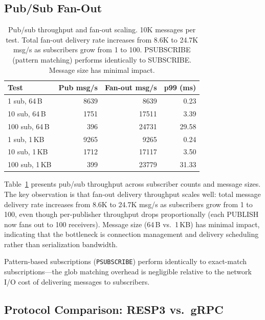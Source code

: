 \documentclass[conference]{IEEEtran}
\begin{document}
\subsection{Pub/Sub Fan-Out}

\begin{table}[t]
\centering
\caption{Pub/sub throughput and fan-out scaling. 10K messages per test.
Total fan-out delivery rate increases from 8.6K to 24.7K msg/s as
subscribers grow from 1 to 100. PSUBSCRIBE (pattern matching) performs
identically to SUBSCRIBE. Message size has minimal impact.}
\label{tab:pubsub}
\small
\begin{tabular}{@{}lrrr@{}}
\toprule
\textbf{Test} & \textbf{Pub msg/s} & \textbf{Fan-out msg/s} & \textbf{p99 (ms)} \\
\midrule
1 sub, 64\,B    & \num{8639}  & \num{8639}   & 0.23 \\
10 sub, 64\,B   & \num{1751}  & \num{17511}  & 3.39 \\
100 sub, 64\,B  & \num{396}   & \num{24731}  & 29.58 \\
1 sub, 1\,KB    & \num{9265}  & \num{9265}   & 0.24 \\
10 sub, 1\,KB   & \num{1712}  & \num{17117}  & 3.50 \\
100 sub, 1\,KB  & \num{399}   & \num{23779}  & 31.33 \\
\bottomrule
\end{tabular}
\end{table}

Table~\ref{tab:pubsub} presents pub/sub throughput across subscriber
counts and message sizes. The key observation is that fan-out
delivery throughput scales well: total message delivery rate
increases from 8.6K to 24.7K msg/s as subscribers grow from 1 to
100, even though per-publisher throughput drops proportionally
(each PUBLISH now fans out to 100 receivers). Message size (64\,B
vs.\ 1\,KB) has minimal impact, indicating that the bottleneck is
connection management and delivery scheduling rather than
serialization bandwidth.

Pattern-based subscriptions (\texttt{PSUBSCRIBE}) perform
identically to exact-match subscriptions---the glob matching
overhead is negligible relative to the network I/O cost of
delivering messages to subscribers.


\subsection{Protocol Comparison: RESP3 vs.\ gRPC}
\end{document}
